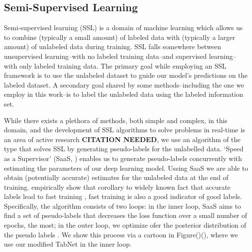 \subsection{Semi-Supervised Learning}\label{sec:DL_SSL}
Semi-supervised learning (SSL) is a domain of machine learning which allows us to combine (typically a small amount) of labeled data with (typically a larger amount) of unlabeled data during training. SSL falls somewhere between unsupervised learning--with no labeled training data--and supervised learning--with only labeled training data. The primary goal while employing an SSL framework is to use the unlabeled dataset to guide our model's predictions on the labeled dataset. A secondary goal shared by some methods--including the one we employ in this work--is to label the unlabeled data using the labeled information set.

While there exists a plethora of methods, both simple and complex, in this domain, and the development of SSL algorithms to solve problems in real-time is an area of active research \textbf{CITATION NEEDED}, we use an algorithm of the type that solves SSL by generating pseudo-labels for the unlabelled data. `Speed as a Supervisor' (SaaS, \cite{saas1}) enables us to generate pseudo-labels concurrently with estimating the parameters of our deep learning model. Ussing SaaS we are able to obtain (potentially accurate) estimates for the unlabeled data at the end of training. \cite{saas1} empirically show that corollary to widely known fact that accurate labels lead to fast training \citep{good_labels_leadsto_fast_training}, fast training is also a good indicator of good labels. Specifically, the algorithm consists of two loops: in the inner loop, SaaS aims to find a set of pseudo-labels that decreases the loss function over a small number of epochs, the most; in the outer loop, we optimize ofer the posterior distribution of the pseudo labels \cite{saas2} . We show this process via a cartoon in Figure()(), where we use our modified TabNet in the inner loop.

